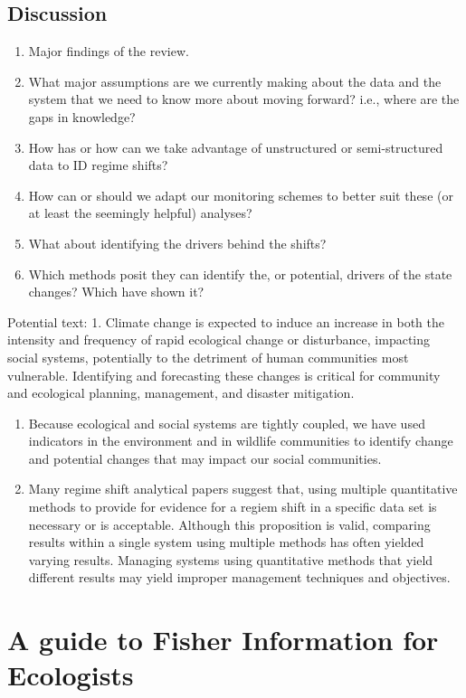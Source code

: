 \documentclass[12pt,twoside]{reedthesis}
\providecommand{\tightlist}{%
  \setlength{\itemsep}{0pt}\setlength{\parskip}{0pt}}
\def\labelenumi{\arabic{enumi}.}
\def\labelenumi{\arabic{enumi}.}
\begin{document}
\hypertarget{discussion}{%
\section{Discussion}\label{discussion}}
\begin{enumerate}
\def\labelenumi{\arabic{enumi}.}
\tightlist
\item
  Major findings of the review.
\item
  What major assumptions are we currently making about the data and the system that we need to know more about moving forward? i.e., where are the gaps in knowledge?
\item
  How has or how can we take advantage of unstructured or semi-structured data to ID regime shifts?
\item
  How can or should we adapt our monitoring schemes to better suit these (or at least the seemingly helpful) analyses?
\item
  What about identifying the drivers behind the shifts?
\item
  Which methods posit they can identify the, or potential, drivers of the state changes? Which have shown it?
\end{enumerate}
Potential text:
1. Climate change is expected to induce an increase in both the intensity and frequency of rapid ecological change or disturbance, impacting social systems, potentially to the detriment of human communities most vulnerable. Identifying and forecasting these changes is critical for community and ecological planning, management, and disaster mitigation.
\begin{enumerate}
\def\labelenumi{\arabic{enumi}.}
\item
  Because ecological and social systems are tightly coupled, we have used indicators in the environment and in wildlife communities to identify change and potential changes that may impact our social communities.
\item
  Many regime shift analytical papers suggest that, using multiple quantitative methods to provide for evidence for a regiem shift in a specific data set is necessary or is acceptable. Although this proposition is valid, comparing results within a single system using multiple methods has often yielded varying results. Managing systems using quantitative methods that yield different results may yield improper management techniques and objectives.
\end{enumerate}
\hypertarget{fiGuide}{%
\chapter{A guide to Fisher Information for Ecologists}\label{fiGuide}}
\end{document}
